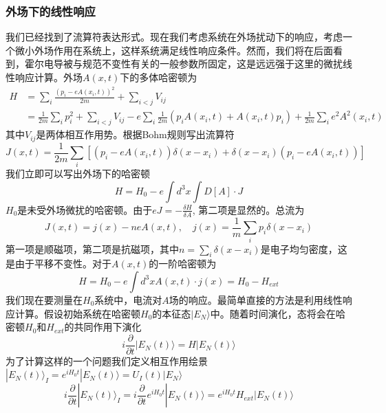 \documentclass{article}
\numberwithin{equation}{subsection}
\begin{document}
\subsubsection{外场下的线性响应}
我们已经找到了流算符表达形式。现在我们考虑系统在外场扰动下的响应，考虑一个微小外场作用在系统上，这样系统满足线性响应条件。然而，我们将在后面看到，霍尔电导被与规范不变性有关的一般参数所固定，这是远远强于这里的微扰线性响应计算。外场$A(x,t)$下的多体哈密顿为
\begin{equation}
    \begin{split}
        H&=\sum_i\frac{(p_i-eA(x_i,t))^2}{2m}+\sum_{i<j}V_{ij}\\
        &=\frac{1}{2m}\sum_{i}p_i^2+\sum_{i<j}V_{ij}-e\sum_{i}\frac{1}{2m}(p_iA(x_i,t)+A(x_i,t)p_i)+\frac{1}{2m}\sum_ie^2A^2(x_i,t)
    \end{split}
\end{equation}
其中$V_{ij}$是两体相互作用势。根据Bohm规则写出流算符
\begin{equation}
    J(x,t)=\frac{1}{2m}\sum_{i}[(p_i-eA(x_i,t))\delta(x-x_i)+\delta(x-x_i)(p_i-eA(x_i,t))]
\end{equation}
我们立即可以写出外场下的哈密顿
\begin{equation}
    H=H_0-e\int d^3x\int D[A]\cdot J
\end{equation}
$H_0$是未受外场微扰的哈密顿。由于$eJ=-\frac{\delta H}{\delta A}$, 第二项是显然的。总流为
\begin{equation}
    J(x,t)=j(x)-neA(x,t),\quad j(x)=\frac{1}{m}\sum_{i}p_i\delta(x-x_i)
\end{equation}
第一项是顺磁项，第二项是抗磁项，其中$n=\sum_{i}\delta(x-x_i)$是电子均匀密度，这是由于平移不变性。对于$A(x,t)$的一阶哈密顿为
\begin{equation}
    H=H_0-e\int d^3xA(x,t)\cdot j(x)=H_0-H_{ext}
\end{equation}
我们现在要测量在$H_0$系统中，电流对$A$场的响应。最简单直接的方法是利用线性响应计算。假设初始系统在哈密顿$H_0$的本征态$|E_N\rangle$中。随着时间演化，态将会在哈密顿$H_0$和$H_{ext}$的共同作用下演化
\begin{equation}
    i\frac{\partial}{\partial t}|E_N(t)\rangle=H|E_N(t)\rangle
\end{equation}
为了计算这样的一个问题我们定义相互作用绘景$|E_N(t)\rangle_I=e^{iH_0t}|E_N(t)\rangle=U_I(t)|E_N\rangle$
\begin{equation}
    i\frac{\partial}{\partial t}|E_N(t)\rangle_I=i\frac{\partial}{\partial t}e^{iH_0t}|E_N(t)\rangle=e^{iH_0t}H_{ext}|E_N(t)\rangle
\end{equation}
\end{document}

